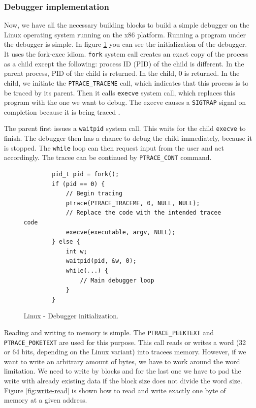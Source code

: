 \subsubsection{Debugger implementation}
Now, we have all the necessary building blocks to build a simple debugger on
the Linux operating system running on the x86 platform. Running a program under
the debugger is simple. In figure \ref{fig:debugger-init} you can see the
initialization of the debugger. It uses the fork-exec idiom. \texttt{fork}
system call creates an exact copy of the process as a child except the
following: process ID (PID) of the child is different. In the parent process,
PID of the child is returned. In the child, $0$ is returned. In the child, we
initiate the \texttt{PTRACE\_TRACEME} call, which indicates that this process
is to be traced by its parent. Then it calls \texttt{execve} system call, which
replaces this program with the one we want to debug. The execve causes a
\texttt{SIGTRAP} signal on completion because it is being traced
\cite{execve}.

The parent first issues a \texttt{waitpid} system call. This waits for the
child \texttt{execve} to finish. The debugger then has a chance to debug the
child immediately, because it is stopped. The \texttt{while} loop can then
request input from the user and act accordingly. The tracee can be continued by
\texttt{PTRACE\_CONT} command.

\begin{figure}\label{fig:debugger-init}
    \begin{verbatim}
        pid_t pid = fork();
        if (pid == 0) {
            // Begin tracing
            ptrace(PTRACE_TRACEME, 0, NULL, NULL);
            // Replace the code with the intended tracee code
            execve(executable, argv, NULL);
        } else {
            int w;
            waitpid(pid, &w, 0);
            while(...) {
                // Main debugger loop
            }
        }
    \end{verbatim}
    \caption{Linux - Debugger initialization.}
\end{figure}

Reading and writing to memory is simple. The \texttt{PTRACE\_PEEKTEXT} and
\texttt{PTRACE\_POKETEXT} are used for this purpose. This call reads or writes
a word (32 or 64 bits, depending on the Linux variant) into tracees memory.
However, if we want to write an arbitrary amount of bytes, we have to work
around the word limitation. We need to write by blocks and for the last one we
have to pad the write with already existing data if the block size does not
divide the word size. Figure \ref{fig:write-read} is shown how to read and
write exactly one byte of memory at a given address.

